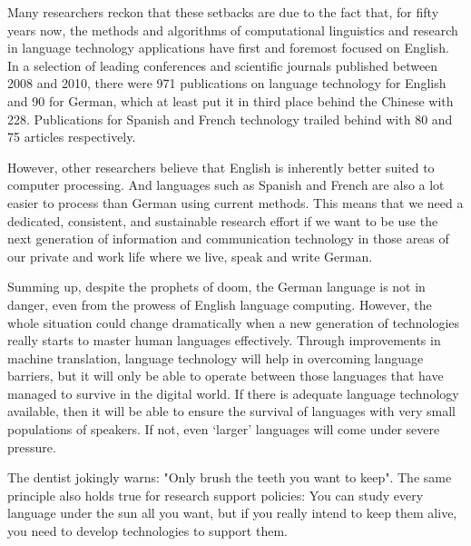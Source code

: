 \begin{multicols}{2}
Many researchers reckon that these setbacks are due to the fact that, for fifty years now, the methods and algorithms of computational linguistics and research in language technology applications have first and foremost focused on English. In a selection of leading conferences and scientific journals published between 2008 and 2010, there were 971 publications on language technology for English and 90 for German, which at least put it in third place behind the Chinese with 228. Publications for Spanish and French technology trailed behind with 80 and 75 articles respectively.
 
However, other researchers believe that English is inherently better suited to computer processing. And languages such as Spanish and French are also a lot easier to process than German using current methods. This means that we need a dedicated, consistent, and sustainable research effort if we want to be use the next generation of information and communication technology in those areas of our private and work life where we live, speak and write German.

Summing up, despite the prophets of doom, the German language is not in danger, even from the prowess of English language computing. However, the whole situation could change dramatically when a new generation of technologies really starts to master human languages effectively. Through improvements in machine translation, language technology will help in overcoming language barriers, but it will only be able to operate between those languages that have managed to survive in the digital world. If there is adequate language technology available, then it will be able to ensure the survival of languages with very small populations of speakers. If not, even ‘larger’ languages will come under severe pressure.


The dentist jokingly warns: "Only brush the teeth you want to keep". The same principle also holds true for research support policies: You can study every language under the sun all you want, but if you really intend to keep them alive, you need to develop technologies to support them.


\end{multicols}
